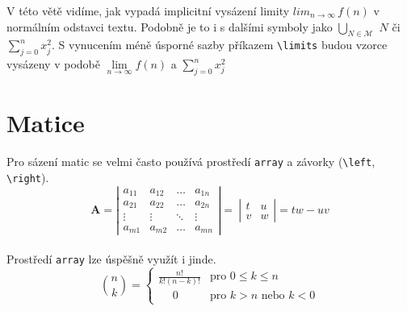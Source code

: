 \documentclass[twocolumn, 11pt, a4paper]{article}
\begin{document}
\begin{twocolumn}
V této větě vidíme, jak vypadá implicitní vysázení limity $lim_{n\rightarrow \infty } \,f(n)$ v normálním odstavci textu. Podobně je to i s dalšími symboly jako $\bigcup_{N \in \mathcal{M}}$ $N$ či $\sum_{j=0}^n x_j^2$.
S vynucením méně úsporné sazby příkazem \verb-\limits- budou vzorce vysázeny v podobě $\lim\limits_{n\rightarrow\infty} f(n)$ a $\sum\limits _{j=0}^n x_j^2$ 
\section{Matice}
Pro sázení matic se velmi často používá prostředí \verb-array- a závorky (\verb-\left-, \verb-\right-).
$$
\mathbf{A} = 
\left| 
\begin{array}{cccc}
    a_{11} &  a_{12} & \dots & a_{1n}\\
    a_{21} &  a_{22} & \dots & a_{2n}\\
    \vdots & \vdots & \ddots & \vdots\\
    a_{m1} &  a_{m2} & \dots & a_{mn} 
    \end{array} 
    \right|=\
	\left|
	\begin{array}{cc}
	t & u \\
	v & w
	\end{array}
	\right|
	= tw - uv
$$\\

Prostředí \verb-array- lze úspěšně využít i jinde.
$$
	\binom{n}{k} =
	\left\{
	\begin{array}{ll}
	\frac{n!}{k! (n - k)!} &  \text{pro } 0 \leq k \leq n \\
	\quad\; 0 & \text{pro } k > n \text{ nebo } k < 0
	\end{array}
	\right.
	$$
\end{twocolumn}
\end{document}
